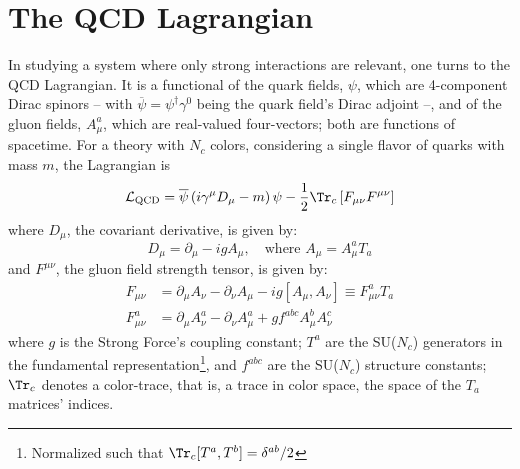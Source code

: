 \section{The QCD Lagrangian}

In studying a system where only strong interactions are relevant, one turns to the QCD Lagrangian. It is a functional of the quark fields, $\psi$, which are 4-component Dirac spinors -- with $\overline{\psi} = \psi^\dagger \gamma^0$ being the quark field's Dirac adjoint --, and of the gluon fields, $A^a_\mu$, which are real-valued four-vectors; both are functions of spacetime. For a theory with $N_c$ colors, considering a single flavor of quarks with mass $m$,
the Lagrangian is
\begin{equation}
	\mathcal{L}_\text{QCD} = \overline{\psi} \left(i \gamma^\mu D_\mu - m \right) \psi - \frac{1}{2} \Tr_c \left[ F_{\mu \nu} F^{\mu \nu} \right] %
	\label{eq:QCD_Lagrangian}
\end{equation}
where $D_\mu$, the covariant derivative, is given by:
\begin{equation}
	D_\mu =  \partial_\mu - i g A_\mu, \quad \text{where }  A_\mu = A_\mu^a T_a
\end{equation}
and $F^{\mu \nu}$, the gluon field strength tensor, is given by:
\begin{equation}
	\begin{split}
		F_{\mu \nu} & = \partial_\mu A_\nu - \partial_\nu A_\mu - ig [A_\mu, A_\nu] \equiv F_{\mu \nu}^a T_a\\
		F_{\mu \nu}^a & = \partial_\mu A_\nu^a - \partial_\nu A_\mu^a + g f^{a b c} A^b_\mu A^c_\nu
	\end{split}
\end{equation}
where $g$ is the Strong Force's coupling constant; $T^a$ are the SU($N_c$) generators in the fundamental representation\footnote{Normalized such that $\Tr_c [T^a, T^b] = \delta^{ab}/2$}, and $f^{abc}$ are the SU($N_c$) structure constants; $\Tr_c$ denotes a color-trace, that is, a trace in color space, the space of the $T_a$ matrices' indices.


